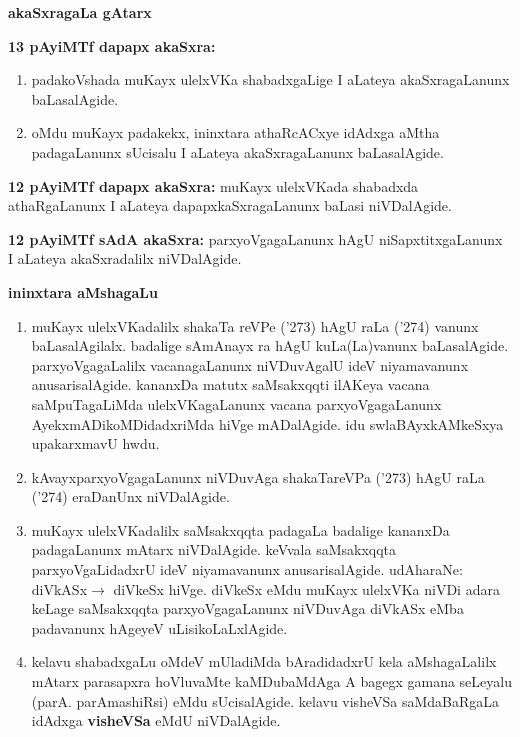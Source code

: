 \eject

\begin{center}
\textbf{akaSxragaLa gAtarx}
\end{center}
\smallskip

\noindent
\textbf{13 pAyiMTf dapapx akaSxra:}
\begin{enumerate}
\item padakoVshada muKayx ulelxVKa shabadxgaLige I aLateya akaSxragaLanunx baLasalAgide.

\item oMdu muKayx padakekx, ininxtara athaRcACxye idAdxga aMtha padagaLanunx sUcisalu I aLateya akaSxragaLanunx baLasalAgide.
\end{enumerate}

\noindent
\textbf{12 pAyiMTf dapapx akaSxra:} muKayx ulelxVKada shabadxda athaRgaLanunx I aLateya dapapxkaSxragaLanunx baLasi niVDalAgide.

\smallskip

\noindent
\textbf{12 pAyiMTf sAdA akaSxra:} parxyoVgagaLanunx hAgU niSapxtitxgaLanunx I aLateya akaSxradalilx niVDalAgide.

\smallskip
\begin{center}
\textbf{ininxtara aMshagaLu}
\end{center}
\begin{enumerate}
\item muKayx ulelxVKadalilx shakaTa reVPe (\char'273) hAgU raLa (\char'274) vanunx baLasalAgilalx. badalige sAmAnayx ra hAgU kuLa(La)vanunx baLasalAgide. parxyoVgagaLalilx vacanagaLanunx niVDuvAgalU ideV niyamavanunx anusarisalAgide. kananxDa matutx saMsakxqqti ilAKeya vacana saMpuTagaLiMda ulelxVKagaLanunx vacana parxyoVgagaLanunx AyekxmADikoMDidadxriMda hiVge mADalAgide. idu swlaBAyxkAMkeSxya upakarxmavU hwdu.

\item kAvayxparxyoVgagaLanunx niVDuvAga shakaTareVPa (\char'273) hAgU raLa (\char'274) eraDanUnx niVDalAgide.

\item muKayx ulelxVKadalilx saMsakxqqta padagaLa badalige kananxDa padagaLanunx mAtarx niVDalAgide. keVvala saMsakxqqta parxyoVgaLidadxrU ideV niyamavanunx anusarisalAgide. udAharaNe: diVkASx$\rightarrow$ diVkeSx hiVge. diVkeSx eMdu muKayx ulelxVKa niVDi adara keLage saMsakxqqta parxyoVgagaLanunx niVDuvAga diVkASx eMba padavanunx hAgeyeV uLisikoLaLxlAgide.

\item kelavu shabadxgaLu oMdeV mUladiMda bAradidadxrU kela aMshagaLalilx mAtarx parasapxra hoVluvaMte kaMDubaMdAga A bagegx gamana seLeyalu (parA. parAmashiRsi) eMdu sUcisalAgide. kelavu visheVSa saMdaBaRgaLa idAdxga \textbf{visheVSa} eMdU niVDa\-lAgide.
\end{enumerate}

